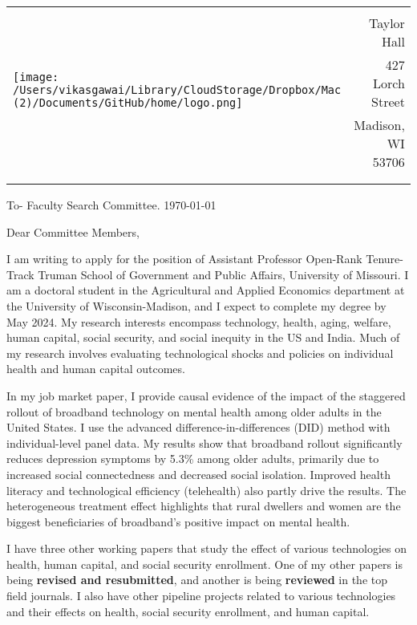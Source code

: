 \documentclass[12pt]{letter}
\begin{document}
\begin{tabularx}{\textwidth}{Xr}
\multirow{4}{*}{\texttt{[image: /Users/vikasgawai/Library/CloudStorage/Dropbox/Mac (2)/Documents/GitHub/home/logo.png]}} &  \\
& Taylor Hall \\
& 427 Lorch Street \\
& Madison, WI 53706 \\
[-1.8ex]\\
\\
\end{tabularx}

To- Faculty Search Committee. \hfill \today 
\medskip

Dear Committee Members,

I am writing to apply for the position of Assistant Professor Open-Rank Tenure-Track Truman School of Government and Public Affairs, University of Missouri. I am a doctoral student in the Agricultural and Applied Economics department at the University of Wisconsin-Madison, and I expect to complete my degree by May 2024. My research interests encompass technology, health, aging, welfare, human capital, social security, and social inequity in the US and India. Much of my research involves evaluating technological shocks and policies on individual health and human capital outcomes.

In my job market paper, I provide causal evidence of the impact of the staggered rollout of broadband technology on mental health among older adults in the United States. I use the advanced difference-in-differences (DID) method with individual-level panel data. My results show that broadband rollout significantly reduces depression symptoms by 5.3\% among older adults, primarily due to increased social connectedness and decreased social isolation. Improved health literacy and technological efficiency (telehealth) also partly drive the results. The heterogeneous treatment effect highlights that rural dwellers and women are the biggest beneficiaries of broadband’s positive impact on mental health. 


I have three other working papers that study the effect of various technologies on health, human capital, and social security enrollment. One of my other papers is being \textbf{revised and resubmitted}, and another is being  \textbf{reviewed} in the top field journals. I also have other pipeline projects related to various technologies and their effects on health, social security enrollment, and human capital.
\end{document}
